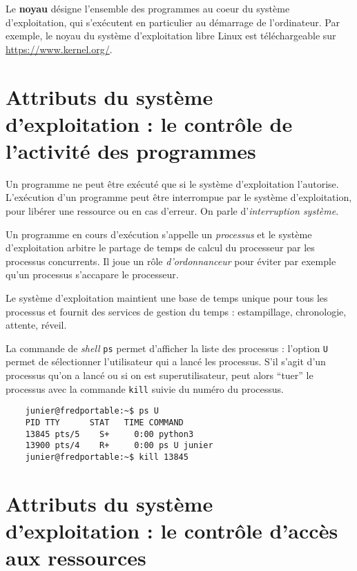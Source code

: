 \documentclass[
  11pt,
]{article}
\newcounter{cours}
\newcounter{prog}
\newcounter{logi}
\begin{document}
Le \textbf{noyau} désigne l'ensemble des programmes au coeur du système
d'exploitation, qui s'exécutent en particulier au démarrage de
l'ordinateur. Par exemple, le noyau du système d'exploitation libre
Linux est téléchargeable sur \url{https://www.kernel.org/}.

\hypertarget{attributs-du-systuxe8me-dexploitation-le-contruxf4le-de-lactivituxe9-des-programmes}{%
\section{Attributs du système d'exploitation : le contrôle de l'activité
des
programmes}\label{attributs-du-systuxe8me-dexploitation-le-contruxf4le-de-lactivituxe9-des-programmes}}

Un programme ne peut être exécuté que si le système d'exploitation
l'autorise. L'exécution d'un programme peut être interrompue par le
système d'exploitation, pour libérer une ressource ou en cas d'erreur.
On parle d'\emph{interruption système}.

Un programme en cours d'exécution s'appelle un \emph{processus} et le
système d'exploitation arbitre le partage de temps de calcul du
processeur par les processus concurrents. Il joue un rôle
\emph{d'ordonnanceur} pour éviter par exemple qu'un processus s'accapare
le processeur.

Le système d'exploitation maintient une base de temps unique pour tous
les processus et fournit des services de gestion du temps :
estampillage, chronologie, attente, réveil.

La commande de \emph{shell} \texttt{ps} permet d'afficher la liste des
processus : l'option \texttt{U} permet de sélectionner l'utilisateur qui
a lancé les processus. S'il s'agit d'un processus qu'on a lancé ou si on
est superutilisateur, peut alors ``tuer'' le processus avec la commande
\texttt{kill} suivie du numéro du processus.

\begin{verbatim}
    junier@fredportable:~$ ps U
    PID TTY      STAT   TIME COMMAND
    13845 pts/5    S+     0:00 python3
    13900 pts/4    R+     0:00 ps U junier
    junier@fredportable:~$ kill 13845
\end{verbatim}

\hypertarget{attributs-du-systuxe8me-dexploitation-le-contruxf4le-daccuxe8s-aux-ressources}{%
\section{Attributs du système d'exploitation : le contrôle d'accès aux
ressources}\label{attributs-du-systuxe8me-dexploitation-le-contruxf4le-daccuxe8s-aux-ressources}}
\end{document}
